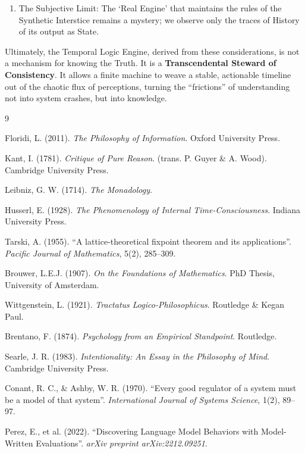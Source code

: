\documentclass[11pt, a4paper]{article}
\theoremstyle{formalism}
\begin{document}
{\begin{enumerate}
\item The Subjective Limit: The `Real Engine' that maintains the rules of the
      Synthetic Interstice remains a mystery; we observe only the traces
      of History of its output as State.

\end{enumerate}

Ultimately, the Temporal Logic Engine, derived from these considerations, is
not a mechanism for knowing the Truth. It is a \textbf{Transcendental Steward
of Consistency}. It allows a finite machine to weave a stable, actionable
timeline out of the chaotic flux of perceptions, turning the ``frictions'' of
understanding not into system crashes, but into knowledge.

\begin{thebibliography}{9}

Floridi, L. (2011).
\textit{The Philosophy of Information}.
Oxford University Press.

Kant, I. (1781). 
\textit{Critique of Pure Reason}. 
(trans. P. Guyer \& A. Wood). Cambridge University Press.

Leibniz, G. W. (1714). 
\textit{The Monadology}.

Husserl, E. (1928). 
\textit{The Phenomenology of Internal Time-Consciousness}. 
Indiana University Press.

Tarski, A. (1955). 
``A lattice-theoretical fixpoint theorem and its applications''. 
\textit{Pacific Journal of Mathematics}, 5(2), 285–309.

Brouwer, L.E.J. (1907). 
\textit{On the Foundations of Mathematics}. 
PhD Thesis, University of Amsterdam.

Wittgenstein, L. (1921). 
\textit{Tractatus Logico-Philosophicus}. 
Routledge \& Kegan Paul.

Brentano, F. (1874).
\textit{Psychology from an Empirical Standpoint}.
Routledge.

Searle, J. R. (1983).
\textit{Intentionality: An Essay in the Philosophy of Mind}.
Cambridge University Press.

Conant, R. C., \& Ashby, W. R. (1970). 
``Every good regulator of a system must be a model of that system''. 
\textit{International Journal of Systems Science}, 1(2), 89--97.

Perez, E., et al. (2022). 
``Discovering Language Model Behaviors with Model-Written Evaluations''. 
\textit{arXiv preprint arXiv:2212.09251}.


\end{thebibliography}}
\end{document}
